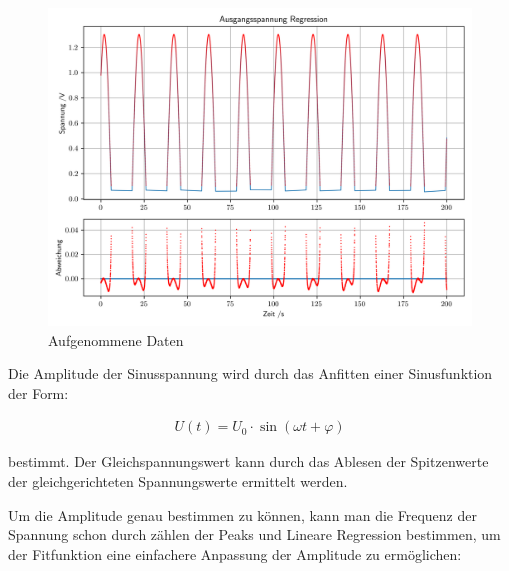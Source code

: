 \documentclass[12pt,twoside,a4paper]{scrartcl}
\begin{document}
			\begin{figure}[H]
				\centering

				\includegraphics[width = 0.8 \textwidth]{Plots/rectifier/ausgang}

				\caption{Aufgenommene Daten}
				\label{Gleichrichter::Daten}
			\end{figure}

			Die Amplitude der Sinusspannung wird durch das Anfitten einer Sinusfunktion der Form:

			\begin{align*}
				U(t) = U_0 \cdot \sin(\omega t + \varphi)
			\end{align*}

			bestimmt. Der Gleichspannungswert kann durch das Ablesen der Spitzenwerte der gleichgerichteten Spannungswerte ermittelt werden.

			Um die Amplitude genau bestimmen zu können, kann man die Frequenz der Spannung schon durch zählen der Peaks und Lineare Regression bestimmen, um der Fitfunktion eine einfachere Anpassung der Amplitude zu ermöglichen:
\end{document}
